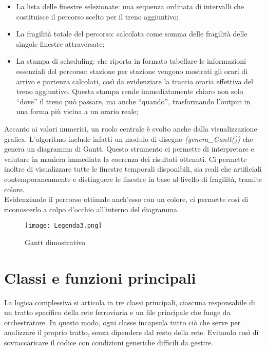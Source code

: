 \documentclass[a4paper,12pt]{report}
\begin{document}
\begin{itemize}
    \item La lista delle finestre selezionate: una sequenza ordinata di intervalli che costituisce il percorso scelto per il treno aggiuntivo;
    
    \item La fragilità totale del percorso: calcolata come somma delle fragilità delle singole finestre attraversate;

    \item La stampa di scheduling: che riporta in formato tabellare le informazioni essenziali del percorso: stazione per stazione vengono mostrati gli orari di arrivo e partenza calcolati, così da evidenziare la traccia oraria effettiva del treno aggiuntivo. Questa stampa rende immediatamente chiaro non solo “dove” il treno può passare, ma anche “quando”, trasformando l’output in una forma più vicina a un orario reale;
    \end{itemize}
    Accanto ai valori numerici, un ruolo centrale è svolto anche dalla visualizzazione grafica. L’algoritmo include infatti un modulo di disegno \textit{(genera\_Gantt())} che genera un diagramma di Gantt.
    Questo strumento ci permette di interpretare e valutare in maniera immediata la coerenza dei risultati ottenuti.
    Ci permette inoltre di visualizzare tutte le finestre temporali disponibili, sia reali che artificiali contemporaneamente e distinguere le finestre in base al livello di fragilità, tramite colore. \\ Evidenziando il percorso ottimale anch'esso con un colore, ci permette così di riconoscerlo a colpo d’occhio all’interno del diagramma.

\begin{figure}
    \centering
    \texttt{[image: Legenda3.png]}
    \caption{Gantt dimostrativo}
    \label{fig:placeholder}
\end{figure}



\section{Classi e funzioni principali}
La logica complessiva si articola in tre classi principali, ciascuna responsabile di un tratto specifico della rete ferroviaria e un file principale che funge da orchestratore. In questo modo, ogni classe incapsula tutto ciò che serve per analizzare il proprio tratto, senza dipendere dal resto della rete. Evitando così di sovraccaricare il codice con condizioni generiche difficili da gestire.
\end{document}
